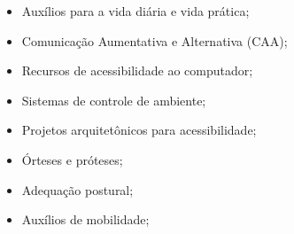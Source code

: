 \begin{itemize}
\item Auxílios para a vida diária e vida prática;%
\item Comunicação Aumentativa e Alternativa (CAA);%
\item Recursos de acessibilidade ao computador;%
\item Sistemas de controle de ambiente;%
\item Projetos arquitetônicos para acessibilidade;%
\item Órteses e próteses;%
\item Adequação postural;%
\item Auxílios de mobilidade;%

\end{itemize}
